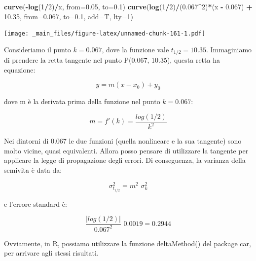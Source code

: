 \documentclass[a4paper,12pt,oneside]{book}
\newenvironment{Shaded}{\begin{snugshade}}{\end{snugshade}}
\newcommand{\KeywordTok}[1]{\textcolor[rgb]{0.13,0.29,0.53}{\textbf{#1}}}
\newcommand{\DataTypeTok}[1]{\textcolor[rgb]{0.13,0.29,0.53}{#1}}
\newcommand{\DecValTok}[1]{\textcolor[rgb]{0.00,0.00,0.81}{#1}}
\newcommand{\FloatTok}[1]{\textcolor[rgb]{0.00,0.00,0.81}{#1}}
\newcommand{\StringTok}[1]{\textcolor[rgb]{0.31,0.60,0.02}{#1}}
\newcommand{\OperatorTok}[1]{\textcolor[rgb]{0.81,0.36,0.00}{\textbf{#1}}}
\newcommand{\NormalTok}[1]{#1}
\theoremstyle{definition}
\theoremstyle{definition}
\theoremstyle{definition}
\theoremstyle{remark}
\begin{document}
\begin{Shaded}
\begin{Highlighting}[]
\KeywordTok{curve}\NormalTok{(}\OperatorTok{-}\KeywordTok{log}\NormalTok{(}\DecValTok{1}\OperatorTok{/}\DecValTok{2}\NormalTok{)}\OperatorTok{/}\NormalTok{x, }\DataTypeTok{from=}\FloatTok{0.05}\NormalTok{, }\DataTypeTok{to=}\FloatTok{0.1}\NormalTok{)}
\KeywordTok{curve}\NormalTok{(}\KeywordTok{log}\NormalTok{(}\DecValTok{1}\OperatorTok{/}\DecValTok{2}\NormalTok{)}\OperatorTok{/}\NormalTok{(}\FloatTok{0.067}\OperatorTok{^}\DecValTok{2}\NormalTok{)}\OperatorTok{*}\NormalTok{(x }\OperatorTok{-}\StringTok{ }\FloatTok{0.067}\NormalTok{) }\OperatorTok{+}\StringTok{ }
\StringTok{        }\FloatTok{10.35}\NormalTok{, }\DataTypeTok{from=}\FloatTok{0.067}\NormalTok{, }\DataTypeTok{to=}\FloatTok{0.1}\NormalTok{, }\DataTypeTok{add=}\NormalTok{T, }\DataTypeTok{lty=}\DecValTok{1}\NormalTok{)}
\end{Highlighting}
\end{Shaded}

\texttt{[image: \_main\_files/figure-latex/unnamed-chunk-161-1.pdf]}

Consideriamo il punto \(k = 0.067\), dove la funzione vale
\(t_{1/2} = 10.35\). Immaginiamo di prendere la retta tangente nel punto
P(0.067, 10.35), questa retta ha equazione:

\[ y = m (x - x_0) + y_0 \]

dove m è la derivata prima della funzione nel punto \(k=0.067\):

\[ m = f'(k) = \frac{log(1/2)}{k^2}\]

Nei dintorni di 0.067 le due funzioni (quella nonlineare e la sua
tangente) sono molto vicine, quasi equivalenti. Allora posso pensare di
utilizzare la tangente per applicare la legge di propagazione degli
errori. Di conseguenza, la varianza della semivita è data da:

\[\sigma^2_{t_{1/2}} = m^2 \,\, \sigma^2_k\]

e l'errore standard è:

\[\frac{|log(1/2)|}{0.067^2} \,\, 0.0019 = 0.2944\]

Ovviamente, in R, possiamo utilizzare la funzione deltaMethod() del
package car, per arrivare agli stessi risultati.

\begin{Shaded}
\end{Shaded}
\end{document}
